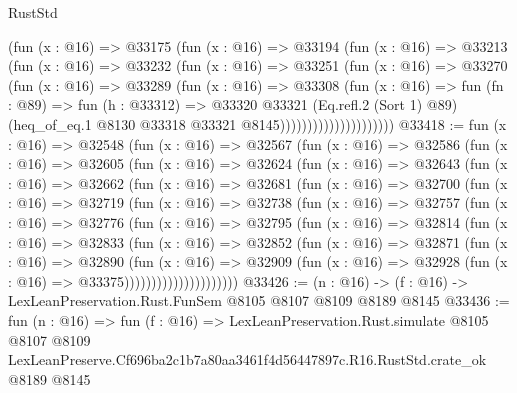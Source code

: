 \begin{lexlean}{RustStd}
\begin{coremodule}
                          (fun (x : @16) =>
                          @33175
                            (fun (x : @16) =>
                            @33194
                              (fun (x : @16) =>
                              @33213
                                (fun (x : @16) =>
                                @33232
                                  (fun (x : @16) =>
                                  @33251
                                    (fun (x : @16) =>
                                    @33270
                                      (fun (x : @16) =>
                                      @33289
                                        (fun (x : @16) =>
                                        @33308
                                          (fun (x : @16) =>
                                          fun (fn : @89) =>
                                          fun (h : @33312) =>
                                          @33320
                                            @33321
                                            (Eq.refl.{2} (Sort 1) @89)
                                            (heq_of_eq.{1}
                                              @8130
                                              @33318
                                              @33321
                                              @8145)))))))))))))))))))))
@33418 := fun (x : @16) =>
  @32548
    (fun (x : @16) =>
    @32567
      (fun (x : @16) =>
      @32586
        (fun (x : @16) =>
        @32605
          (fun (x : @16) =>
          @32624
            (fun (x : @16) =>
            @32643
              (fun (x : @16) =>
              @32662
                (fun (x : @16) =>
                @32681
                  (fun (x : @16) =>
                  @32700
                    (fun (x : @16) =>
                    @32719
                      (fun (x : @16) =>
                      @32738
                        (fun (x : @16) =>
                        @32757
                          (fun (x : @16) =>
                          @32776
                            (fun (x : @16) =>
                            @32795
                              (fun (x : @16) =>
                              @32814
                                (fun (x : @16) =>
                                @32833
                                  (fun (x : @16) =>
                                  @32852
                                    (fun (x : @16) =>
                                    @32871
                                      (fun (x : @16) =>
                                      @32890
                                        (fun (x : @16) =>
                                        @32909
                                          (fun (x : @16) =>
                                          @32928 (fun (x : @16) => @33375)))))))))))))))))))))
@33426 := (n : @16) -> (f : @16) -> LexLeanPreservation.Rust.FunSem @8105 @8107 @8109 @8189 @8145
@33436 := fun (n : @16) =>
  fun (f : @16) =>
  LexLeanPreservation.Rust.simulate
    @8105
    @8107
    @8109
    LexLeanPreserve.Cf696ba2c1b7a80aa3461f4d56447897c.R16.RustStd.crate_ok
    @8189
    @8145
\end{coremodule}
\end{lexlean}
